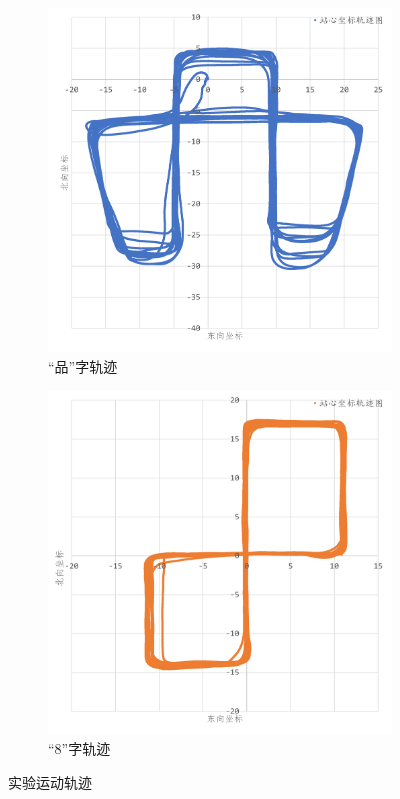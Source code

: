 \documentclass[10pt,a4paper]{ctexart}
\begin{document}
\begin{figure}[H]
    \centering
    {
        \begin{subfigure}{0.49\textwidth}
            \centering
            \includegraphics[width=\linewidth]{Figures/DataFigure/品字参考轨迹.png}
            \caption*{\textrm{``}品\textrm{''}\hspace{0mm}字轨迹}
        \end{subfigure}\hfill
        \begin{subfigure}{0.49\textwidth}
            \centering
            \includegraphics[width=\linewidth]{Figures/DataFigure/8字参考轨迹.png}
            \caption*{\textrm{``}8\textrm{''}\hspace{0mm}字轨迹}
        \end{subfigure}
    }
    \caption{实验运动轨迹}
    \label{fig:6.1}
\end{figure}
\end{document}
